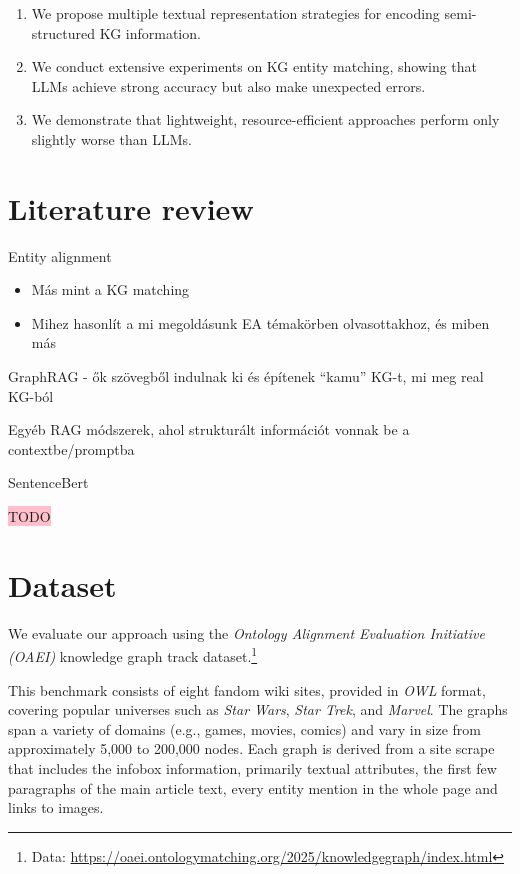 \documentclass[11pt]{article}
\begin{document}
\begin{enumerate}[nosep]
    \setlength\itemsep{0em}
    \setlength\parskip{0em}
    \setlength\parsep{0em}
    \item We propose multiple textual representation strategies for encoding semi-structured KG information.
    \item We conduct extensive experiments on KG entity matching, showing that LLMs achieve strong accuracy but also make unexpected errors.
    \item We demonstrate that lightweight, resource-efficient approaches perform only slightly worse than LLMs.
\end{enumerate}

\section{Literature review}

Entity alignment 
\begin{itemize}
    \item Más mint a KG matching
    \item Mihez hasonlít a mi megoldásunk EA témakörben olvasottakhoz, és miben más
\end{itemize}

GraphRAG - ők szövegből indulnak ki és építenek “kamu” KG-t, mi meg real KG-ból

Egyéb RAG módszerek, ahol strukturált információt vonnak be a contextbe/promptba


SentenceBert \cite{sentencebert}

\colorbox{pink}{TODO}

\section{Dataset}

We evaluate our approach using the \emph{Ontology Alignment Evaluation Initiative (OAEI)} knowledge graph track dataset.\footnote{Data: \url{https://oaei.ontologymatching.org/2025/knowledgegraph/index.html}}

This benchmark consists of eight fandom wiki sites, provided in \textit{OWL} format, covering popular universes such as \textit{Star Wars}, \textit{Star Trek}, and \textit{Marvel}. The graphs span a variety of domains (e.g., games, movies, comics) and vary in size from approximately 5,000 to 200,000 nodes. Each graph is derived from a site scrape that includes the infobox information, primarily textual attributes, the first few paragraphs of the main article text, every entity mention in the whole page and links to images.
\end{document}
